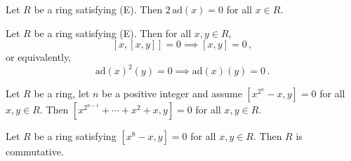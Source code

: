 \documentclass[10pt,a4paper]{amsart}
\newcommand{\ad}[1]{\mathrm{ad}(#1)}
\begin{document}
\begin{lemma}\label{Lem:even}
	Let $R$ be a ring satisfying (E). Then $2\,\ad{x}=0$ for all $x\in R$.
\end{lemma}

\begin{lemma}\label{Lem:NL}
	Let $R$ be a ring satisfying (E). Then for all $x,y\in R$,
	\[
	[x,[x,y]] = 0 \implies [x,y] = 0\,,
	\]
	or equivalently,
	\[
	\ad{x}^2(y) = 0 \implies \ad{x}(y) = 0\,.
	\]
\end{lemma}

\begin{lemma}\label{Lem:equiv}
	Let $R$ be a ring, let $n$ be a positive integer and assume 
	$[x^{2^n} - x,y] = 0$ for all $x,y\in R$. Then 
	$[x^{2^{n-1}} + \cdots + x^2 + x,y] = 0$ for all $x,y\in R$.
\end{lemma}

\begin{theorem}\label{Thm:exp8}
	Let $R$ be a ring satisfying $[x^8 - x,y] = 0$ for all $x,y\in R$. Then
	$R$ is commutative.
\end{theorem}
\end{document}
